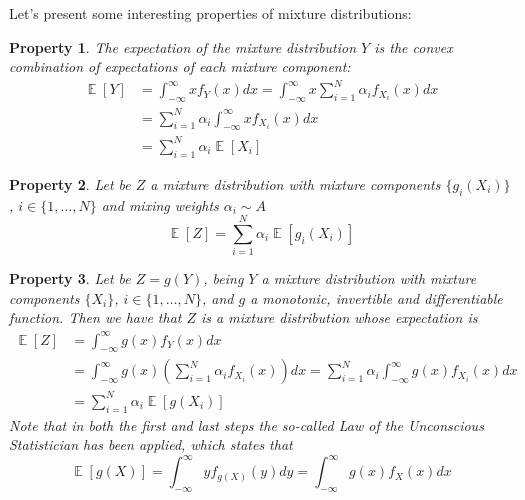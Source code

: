 \documentclass[12pt,a4paper,openright,twoside]{article}
\DeclareMathOperator*{\E}{\mathbb{E}}
\numberwithin{equation}{section}
\theoremstyle{definition}
\theoremstyle{remark}
\theoremstyle{plain}
\newtheorem{mixtureProperty}{Property}
\begin{document}
Let's present some interesting properties of mixture distributions:

\begin{mixtureProperty} \label{mixtureProperty1}
	The expectation of the mixture distribution $Y$ is the convex combination of expectations of each mixture component: 
    \begin{equation} \label{mixtureProperty1eq}
    \begin{split}
        \E [Y] &= \int_{-\infty}^{\infty} x f_{Y}(x) dx = \int_{-\infty}^{\infty} x \sum_{i=1}^{N} \alpha_i f_{X_i}(x) dx \\
        &= \sum_{i=1}^{N} \alpha_i \int_{-\infty}^{\infty} x f_{X_i}(x) dx \\
        &= \sum_{i=1}^{N} \alpha_i \E [X_i]
    \end{split}
    \end{equation}
\end{mixtureProperty}


\begin{mixtureProperty} \label{mixtureProperty2}
	Let be $Z$ a mixture distribution with mixture components $\{g_i(X_i)\}$, $i\in \{1, \dots, N\}$ and mixing weights $\alpha_i \sim A$
    \begin{equation} \label{mixtureProperty2eq}
        \E [Z] = \sum_{i=1}^{N} \alpha_i \E [g_i(X_i)]
    \end{equation}
\end{mixtureProperty}


\begin{mixtureProperty} \label{mixtureProperty3}
	Let be $Z=g(Y)$, being $Y$ a mixture distribution with mixture components $\{X_i\}$, $i\in \{1, \dots, N\}$, and $g$ a monotonic, invertible and differentiable function. Then we have that $Z$ is a mixture distribution whose expectation is
    \begin{equation} \label{mixtureProperty3eq}
        \begin{split}
        \E [Z] &= \int_{-\infty}^{\infty} g(x) f_{Y}(x) dx \\
        &= \int_{-\infty}^{\infty} g(x) \left( \sum_{i=1}^{N} \alpha_i f_{X_i}(x)\right) dx = \sum_{i=1}^{N} \alpha_i \int_{-\infty}^{\infty} g(x) f_{X_i}(x) dx \\
        &= \sum_{i=1}^{N} \alpha_i \E [g(X_i)]
        \end{split}
    \end{equation}
    Note that in both the first and last steps the so-called Law of the Unconscious Statistician has been applied, which states that
    \begin{equation} \label{LOTUS}
    	\E [g(X)] = \int_{-\infty}^{\infty} y f_{g(X)}(y) dy  = \int_{-\infty}^{\infty} g(x) f_{X}(x) dx
    \end{equation}

\end{mixtureProperty}
\end{document}
